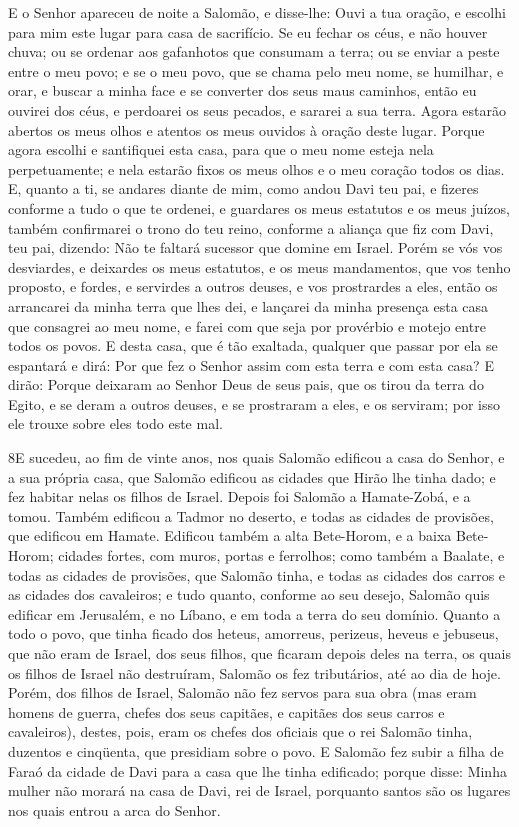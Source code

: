 E o Senhor apareceu de noite a Salomão, e disse-lhe: Ouvi a tua
oração, e escolhi para mim este lugar para casa de sacrifício.
Se eu fechar os céus, e não houver chuva; ou se ordenar aos
gafanhotos que consumam a terra; ou se enviar a peste entre o meu
povo; e se o meu povo, que se chama pelo meu nome, se
humilhar, e orar, e buscar a minha face e se converter dos seus maus
caminhos, então eu ouvirei dos céus, e perdoarei os seus pecados, e
sararei a sua terra. Agora estarão abertos os meus olhos e
atentos os meus ouvidos à oração deste lugar. Porque agora
escolhi e santifiquei esta casa, para que o meu nome esteja nela
perpetuamente; e nela estarão fixos os meus olhos e o meu coração
todos os dias. E, quanto a ti, se andares diante de mim, como
andou Davi teu pai, e fizeres conforme a tudo o que te ordenei, e
guardares os meus estatutos e os meus juízos, também
confirmarei o trono do teu reino, conforme a aliança que fiz com
Davi, teu pai, dizendo: Não te faltará sucessor que domine em
Israel. Porém se vós vos desviardes, e deixardes os meus
estatutos, e os meus mandamentos, que vos tenho proposto, e fordes,
e servirdes a outros deuses, e vos prostrardes a eles, então
os arrancarei da minha terra que lhes dei, e lançarei da minha
presença esta casa que consagrei ao meu nome, e farei com que seja
por provérbio e motejo entre todos os povos. E desta casa,
que é tão exaltada, qualquer que passar por ela se espantará e dirá:
Por que fez o Senhor assim com esta terra e com esta casa? E
dirão: Porque deixaram ao Senhor Deus de seus pais, que os tirou da
terra do Egito, e se deram a outros deuses, e se prostraram a eles,
e os serviram; por isso ele trouxe sobre eles todo este mal.


\medskip

\lettrine{8} E sucedeu, ao fim de vinte anos, nos quais
Salomão edificou a casa do Senhor, e a sua própria casa, que
Salomão edificou as cidades que Hirão lhe tinha dado; e fez habitar
nelas os filhos de Israel. Depois foi Salomão a Hamate-Zobá, e a
tomou. Também edificou a Tadmor no deserto, e todas as cidades
de provisões, que edificou em Hamate. Edificou também a alta
Bete-Horom, e a baixa Bete-Horom; cidades fortes, com muros, portas
e ferrolhos; como também a Baalate, e todas as cidades de
provisões, que Salomão tinha, e todas as cidades dos carros e as
cidades dos cavaleiros; e tudo quanto, conforme ao seu desejo,
Salomão quis edificar em Jerusalém, e no Líbano, e em toda a terra
do seu domínio. Quanto a todo o povo, que tinha ficado dos
heteus, amorreus, perizeus, heveus e jebuseus, que não eram de
Israel, dos seus filhos, que ficaram depois deles na terra, os
quais os filhos de Israel não destruíram, Salomão os fez
tributários, até ao dia de hoje. Porém, dos filhos de Israel,
Salomão não fez servos para sua obra (mas eram homens de guerra,
chefes dos seus capitães, e capitães dos seus carros e cavaleiros),
destes, pois, eram os chefes dos oficiais que o rei Salomão
tinha, duzentos e cinqüenta, que presidiam sobre o povo. E
Salomão fez subir a filha de Faraó da cidade de Davi para a casa que
lhe tinha edificado; porque disse: Minha mulher não morará na casa
de Davi, rei de Israel, porquanto santos são os lugares nos quais
entrou a arca do Senhor.

